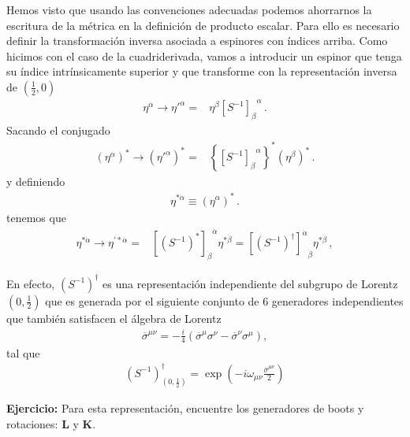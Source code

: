 \begin{frame}
Hemos visto que usando las convenciones adecuadas podemos ahorrarnos
la escritura de la métrica en la definición de producto escalar.
%
Para ello es necesario definir la transformación inversa asociada a
espinores con índices arriba. Como hicimos con el caso de la cuadriderivada, vamos a introducir un espinor que tenga su índice intrínsicamente superior y que transforme con la representación inversa de $(\frac{1}{2},0)$
\begin{align*}
  \eta^{\alpha}\to {\eta'}^{\alpha} =&\eta^\beta{\left[  S^{-1}  \right]_{\beta}}^{\alpha}\,.
\end{align*}
Sacando el conjugado
\begin{align}
 \left( \eta^{\alpha} \right)^{*}\to \left( {\eta'}^{\alpha} \right)^{*} =&\left\{ {\left[  S^{-1}  \right]_{\beta}}^{\alpha} \right\}^{*} \left( \eta^\beta \right)^{*}\,.
\end{align}
y definiendo
\begin{align}
\eta^{*\dot{\alpha}}\equiv  \left( \eta^{\alpha} \right)^{*}\,.
\end{align}
tenemos que
\begin{align*}
  \eta^{*\dot{\alpha}}\to \eta^{\prime *\dot{\alpha}}
  =& {\left[ \left( S^{-1} \right)^{*} \right]_{\dot{\beta}}}^{\dot{\alpha}}\eta^{*\dot{\beta}}={\left[ \left( S^{-1} \right)^{\dagger} \right]^{\dot{\alpha}}}_{\dot{\beta}}\eta^{*\dot{\beta}}\,,
\end{align*}

En efecto, $\left( S^{-1} \right)^{\dagger}$ es una representación independiente del subgrupo de Lorentz $(0,\frac{1}{2})$ que es generada por el siguiente conjunto de 6 generadores independientes que también satisfacen el álgebra de Lorentz
\begin{align*}
  \overline{\sigma}^{\mu\nu}=-\frac{i}{4} \left( \overline{\sigma}^{\mu}\sigma^{\nu}-\overline{\sigma}^{\nu}\sigma^{\mu} \right),
\end{align*}
tal que
\begin{align*}
\left( S^{-1} \right)^{\dagger}_{(0,\frac{1}{2})}=\exp \left( -i \omega_{\mu\nu} \frac{\overline{\sigma}^{\mu\nu}}{2} \right)
\end{align*}

\textbf{Ejercicio:} Para esta representación, encuentre los generadores de boots y rotaciones: $\boldsymbol{L}$ y $\boldsymbol{K}$.

\bigskip


\end{frame}

